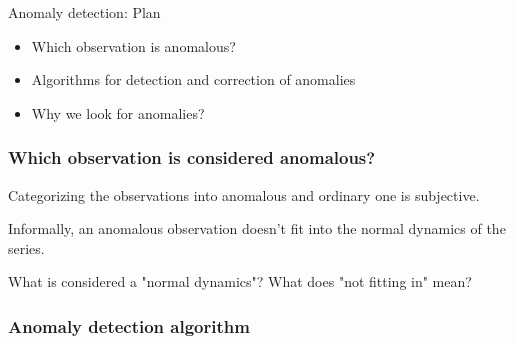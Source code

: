 
\begin{frame} %
	
	
\end{frame}



\begin{frame}{Anomaly detection: Plan}
	\begin{itemize}[<+->]
		\item Which observation is \alert{anomalous}?
		\item Algorithms for \alert{detection and correction} of anomalies
		\item \alert{Why} we look for anomalies?
	\end{itemize}
	
\end{frame}


\begin{frame}
	\frametitle{Which observation is considered anomalous?}
	
	
	\pause
	Categorizing the observations into anomalous and ordinary one is \alert{subjective}.
	
	\pause
	Informally, an anomalous observation \alert{doesn't fit} into the \alert{normal dynamics} of the series.
	
	\pause
	What is considered a "normal dynamics"? What does "not fitting in" mean?
	
\end{frame}

\begin{frame}
	\frametitle{Anomaly detection algorithm}
	
	\begin{itemize}

		

		
		
		
		
	\end{itemize}
	
\end{frame}


